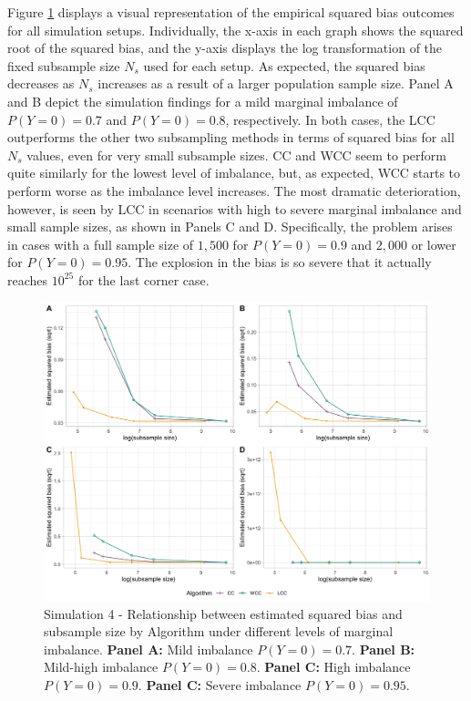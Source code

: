 Figure \ref{fig:all_biases} displays a visual representation of the empirical squared bias outcomes for all simulation setups. Individually, the x-axis in each graph shows the squared root of the squared bias, and the y-axis displays the log transformation of the fixed subsample size $N_s$ used for each setup. As expected, the squared bias decreases as $N_s$ increases as a result of a larger population sample size. Panel A and B depict the simulation findings for a mild marginal imbalance of $P(Y=0)=0.7$ and $P(Y=0)=0.8$, respectively. In both cases, the LCC outperforms the other two subsampling methods in terms of squared bias for all $N_s$ values, even for very small subsample sizes. CC and WCC seem to perform quite similarly for the lowest level of imbalance, but, as expected, WCC starts to perform worse as the imbalance level increases. The most dramatic deterioration, however, is seen by LCC in scenarios with high to severe marginal imbalance and small sample sizes, as shown in Panels C and D. Specifically, the problem arises in cases with a full sample size of $1,500$ for $P(Y=0)=0.9$ and $2,000$ or lower for $P(Y=0)=0.95$. The explosion in the bias is so severe that it actually reaches $10^{25}$ for the last corner case.
\\

\begin{figure}[ht]
    \centering
    \includegraphics[width=\textwidth]{2_Figures/all_bias_smallk.png}
    \caption[Simulation 4 - Relationship between empirical squared bias and subsample size by method]{Simulation 4 - Relationship between estimated squared bias and subsample size by Algorithm under different levels of marginal imbalance.
    \textbf{Panel A:} Mild imbalance $P(Y=0)=0.7$.
    \textbf{Panel B:} Mild-high imbalance $P(Y=0)=0.8$.
    \textbf{Panel C:} High imbalance $P(Y=0)=0.9$.
    \textbf{Panel C:} Severe imbalance $P(Y=0)=0.95$.}
    \label{fig:all_biases}
\end{figure}

